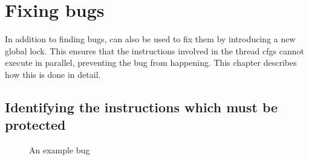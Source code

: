 \chapter{Fixing bugs}
\label{sect:fix_global_lock}

In addition to finding bugs, {\technique} can also be used to fix them
by introducing a new global lock.  This ensures that the instructions
involved in the thread \glspl{cfg} cannot execute in parallel,
preventing the bug from happening.  This chapter describes how this is
done in detail.

\section{Identifying the instructions which must be protected}

\begin{figure}
  \hspace{-5mm}
  \hspace{-10mm}
  \caption{An example bug}
  \label{fig:fix_bug:complex_local}
\end{figure}

